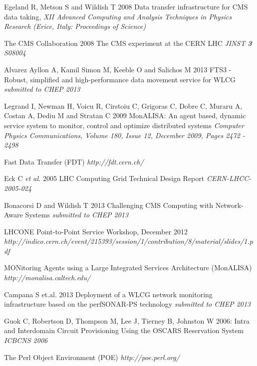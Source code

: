 \begin{thebibliography}{1}

 Egeland R, Metson S and Wildish T 2008 Data transfer infrastructure for CMS data taking,  {\it XII Advanced Computing and Analysis Techniques in Physics Research (Erice, Italy: Proceedings of Science)}

 The CMS Collaboration 2008 The CMS experiment at the CERN LHC {\it JINST {\bf 3} S08004}

 Alvarez Ayllon A, Kamil Simon M, Keeble O and Salichos M 2013 FTS3 - Robust, simplified and high-performance data movement service for WLCG {\it submitted to CHEP 2013}

 Legrand I, Newman H, Voicu R, Cirstoiu C, Grigoras C, Dobre C, Muraru A, Costan A, Dediu M and Stratan C 2009 MonALISA: An agent based, dynamic service system to monitor, control and optimize distributed systems {\it Computer Physics Communications, Volume 180, Issue 12, December 2009, Pages 2472 - 2498}

 Fast Data Transfer (FDT) {\it http://fdt.cern.ch/}

 Eck C {\it et al.} 2005 LHC Computing Grid Technical Design Report {\it CERN-LHCC-2005-024}

 Bonacorsi D and Wildish T 2013 Challenging CMS Computing with Network-Aware Systems {\it submitted to CHEP 2013}

 LHCONE Point-to-Point Service Workshop, December 2012 
 {\it 	http://indico.cern.ch/event/215393/session/1/contribution/8/material/slides/1.pdf}
 

 MONitoring Agents using a Large Integrated Services Architecture (MonALISA) {\it http://monalisa.caltech.edu/}

  Campana S et.al. 2013 Deployment of a WLCG network monitoring infrastructure based on the perfSONAR-PS technology {\it submitted to CHEP 2013}

  Guok C, Robertson D, Thompson M, Lee J, Tierney B, Johnston W 2006: Intra and Interdomain Circuit Provisioning Using the OSCARS Reservation System {\it ICBCNS 2006}

 The Perl Object Environment (POE) {\it http://poe.perl.org/}


\end{thebibliography}
